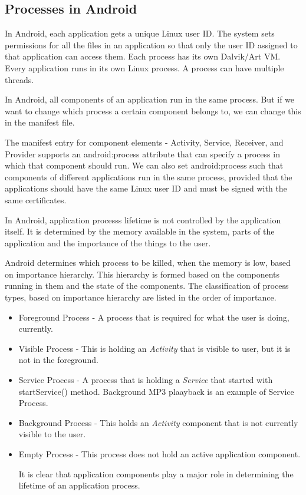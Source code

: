 \documentclass[12pt]{report}
\begin{document}
\subsection{Processes in Android}
In Android, each application gets a unique Linux user ID. 
The system sets permissions for all the files in 
an application so that only the user ID 
assigned to that application can access them.
Each process has its own Dalvik/Art VM.
Every application runs in its own Linux 
process. A process can have multiple threads.


In Android, all components of  an application run in the same process. But if we want to change which process a certain component belongs to, we can change this in the manifest file. 


The manifest entry for component elements  -  Activity, Service, Receiver, and Provider supports an android:process attribute that can specify a process in which that component should run.  We can also set android:process such that components of different applications run in the same process, provided that the applications should have the same Linux user ID and must be signed with the same certificates.


In Android, application process\textquotesingle s lifetime  is not controlled by the application itself. It is determined by the memory available in the system, parts of the application and the importance of the things to the user.


Android determines which process to be killed, when the memory is low, based on importance hierarchy. This hierarchy is formed based on the components running in them and the state of  the components. The classification of process types, based on importance hierarchy are listed in the order of importance.

\begin{itemize}
	\item Foreground Process - A process that is required for what the user is doing, currently.
	\item Visible Process - This is holding an \textit{Activity} that is visible to user, but it is not in the foreground.
	\item Service Process - A process that is holding a \textit{Service} that started with startService() method. Background MP3 plaayback is an example of Service Process.
	\item Background Process - This holds an \textit{Activity} component that is not currently visible to the user.
	\item Empty Process - This process does not hold an active application component.
	
	It is clear that application components play a major role in determining the lifetime of an application process.
	
\end{itemize}
\end{document}
